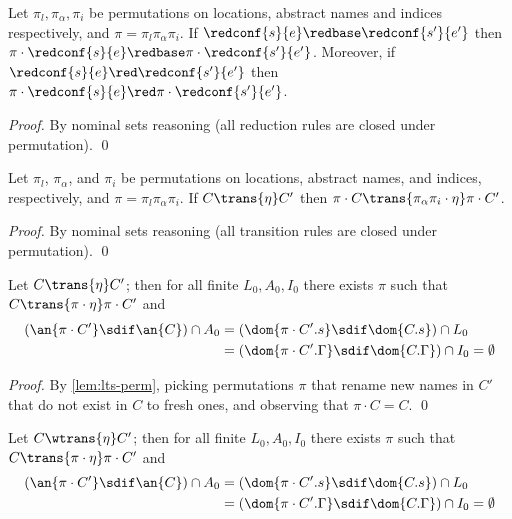\begin{lemma}\label{lem:red-perm}%
  Let $\pi_l,\pi_\alpha,\pi_i$ be permutations on locations,  abstract names and indices respectively, and $\pi=\pi_l\pi_\alpha\pi_i$.
  If $\redconf{s}{e} \redbase \redconf{s'}{e'}$ then
  $\pi\cdot\redconf{s}{e} \redbase \pi\cdot\redconf{s'}{e'}$.
  Moreover,
  if $\redconf{s}{e} \red \redconf{s'}{e'}$ then
  $\pi\cdot\redconf{s}{e} \red \pi\cdot\redconf{s'}{e'}$.
\end{lemma}
\begin{proof}
  By nominal sets reasoning (all reduction rules are closed under permutation).
\qed\end{proof}
\begin{lemma}\label{lem:lts-perm}%
  Let $\pi_l$, $\pi_\alpha$, and $\pi_i$ be
  permutations on locations,  abstract names, and indices, respectively,
 and $\pi=\pi_l\pi_\alpha\pi_i$.
  If $C \trans{\eta} C'$ then
  $\pi\cdot C \trans{\pi_\alpha\pi_i\cdot \eta} \pi\cdot C'$.
\end{lemma}
\begin{proof}
    By nominal sets reasoning (all transition rules are closed under permutation).
\qed\end{proof}
\begin{lemma}\label{lem:lts-permute}%
  Let $C \trans{\eta} C'$; then
  for all finite $L_0,A_0,I_0$ there exists $\pi$ such that
 $C \trans{\pi\cdot\eta} \pi\cdot C'$
  and 
  \begin{align*}
    (\an{\pi\cdot C'}\sdif \an{C})\cap A_0 &= (\dom{\pi\cdot C'.s}\sdif\dom{C.s})\cap L_0 \\
    &= (\dom{\pi\cdot C'.\Gamma}\sdif\dom{C.\Gamma})\cap I_0=\emptyset
  \end{align*}
\end{lemma}
\begin{proof}
  By \cref{lem:lts-perm}, picking permutations $\pi$ that rename new names in $C'$ that do not exist in $C$ to fresh ones, and observing that $\pi\cdot C=C$.
\qed\end{proof}
\begin{corollary}\label{lem:lts-permute-weak}%
  Let $C \wtrans{\eta} C'$; then
  for all finite $L_0,A_0,I_0$ there exists $\pi$ such that
 $C \trans{\pi\cdot\eta} \pi\cdot C'$
  and 
  \begin{align*}
    (\an{\pi\cdot C'}\sdif \an{C})\cap A_0 &= (\dom{\pi\cdot C'.s}\sdif\dom{C.s})\cap L_0 \\
    &= (\dom{\pi\cdot C'.\Gamma}\sdif\dom{C.\Gamma})\cap I_0=\emptyset
  \end{align*}
\end{corollary}
